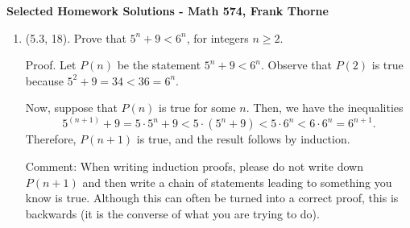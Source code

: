 \documentclass[12pt]{amsart}
\begin{document}
\setlength{\topmargin}{-12mm}






\begin{center}{\bf Selected Homework Solutions - Math 574, Frank Thorne}
\end{center}
\begin{enumerate}[1.]
\item(5.3, 18). Prove that $5^n + 9 < 6^n$, for integers $n \geq 2$.

Proof. Let $P(n)$ be the statement $5^n + 9 < 6^n$. Observe that $P(2)$ is true
because $5^2 + 9 = 34 < 36 = 6^n$. 

Now, suppose that $P(n)$ is true for some $n$. Then, we have the inequalities
$$
5^(n + 1) + 9 = 5 \cdot 5^n + 9 < 5 \cdot(5^n + 9) < 5 \cdot 6^n < 6 \cdot 6^n = 6^{n + 1}.$$
Therefore, $P(n + 1)$ is true, and the result follows by induction.

Comment: When writing induction proofs, please do not write down $P(n + 1)$ and then write
a chain of statements leading to something you know is true. Although this can often be turned into a
correct proof, this is backwards (it is the converse of what you are trying to do).

\end{enumerate}
\end{document}
